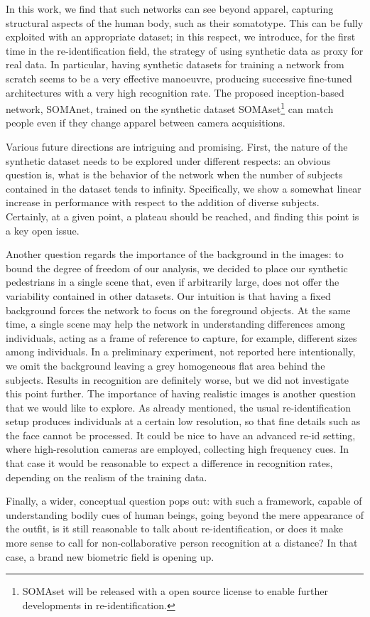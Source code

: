 \documentclass[10pt,journal,letterpaper,compsoc]{IEEEtran}
\begin{document}
In this work, we find that such networks can see beyond apparel, capturing structural aspects of the human body, such as their somatotype. This can be fully exploited with an appropriate dataset; in this respect, we introduce, for the first time in the re-identification field, the strategy of using synthetic data as proxy for real data. In particular, having synthetic datasets for training a network from scratch  seems to be a very effective manoeuvre, producing successive fine-tuned architectures with a very high recognition rate. The proposed inception-based network, SOMAnet, trained on the synthetic dataset SOMAset\footnote{SOMAset will be released with a open source license to enable further developments in re-identification.} can match people even if they change apparel between camera acquisitions.

Various future directions are intriguing and promising. First, the nature of the synthetic dataset needs to be explored under different respects: an obvious question is, what is the behavior of the network when the number of subjects contained in the dataset tends to infinity. Specifically, we show a somewhat linear increase in performance with respect to the addition of diverse subjects. Certainly, at a given point, a plateau should be reached, and finding this point is a key open issue.

Another question regards the importance of the background in the images: to bound the degree of freedom of our analysis, we decided to place our synthetic pedestrians in a single scene that, even if arbitrarily large, does not offer the variability contained in other datasets. Our intuition is that having a fixed background forces the network to focus on the foreground objects. At the same time, a single scene may help the network in understanding differences among individuals, acting as a frame of reference to capture, for example, different sizes among individuals. In a preliminary experiment, not reported here intentionally, we omit the background leaving a grey homogeneous flat area behind the subjects. Results in recognition are definitely worse, but we did not investigate this point further.
The importance of having realistic images is another question that we would like to explore. As already mentioned, the usual re-identification setup produces individuals at a certain low resolution, so that fine details such as the face cannot be processed. It could be nice to have an advanced re-id setting, where high-resolution cameras are employed, collecting high frequency cues. In that case it would be reasonable to expect a difference in recognition rates, depending on the realism of the training data.

Finally, a wider, conceptual question pops out: with such a framework, capable of understanding bodily cues of human beings, going beyond the mere appearance of the outfit, is it still reasonable to talk about re-identification, or does it make more sense to call for non-collaborative person recognition at a distance? In that case, a brand new biometric field is opening up.

{


}
\end{document}
